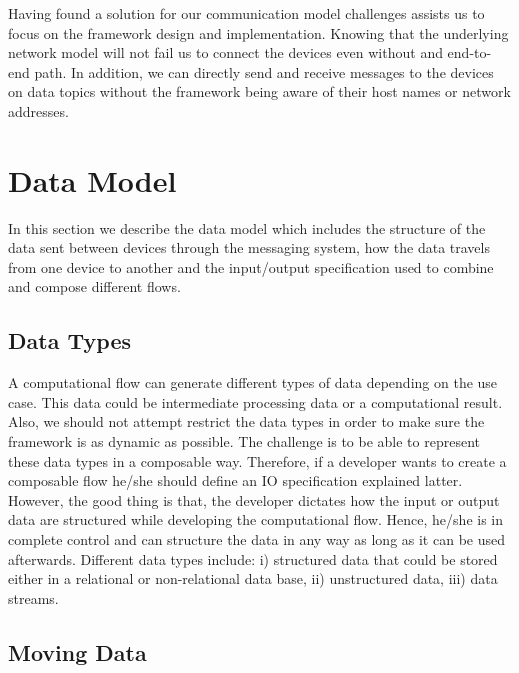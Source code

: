 \noindent Having found a solution for our communication model challenges assists us to focus on the framework design and implementation. Knowing that the underlying network model will not fail us to connect the devices even without and end-to-end path. In addition, we can directly send and receive messages to the devices on data topics without the framework being aware of their host names or network addresses.  




\section{Data Model}
In this section we describe the data model which includes the structure of the data sent between devices through the messaging system, how the data travels from one device to another and the input/output specification used to combine and compose different flows.

\subsection{Data Types}
A computational flow can generate different types of data depending on the use case. This data could be intermediate processing data or a computational result. Also, we should not attempt restrict the data types in order to make sure the framework is as dynamic as possible. The challenge is to be able to represent these data types in a composable way. Therefore, if a developer wants to create a composable flow he/she should define an IO specification explained latter. However, the good thing is that, the developer dictates how the input or output data are structured while developing the computational flow. Hence, he/she is in complete control and can structure the data in any way as long as it can be used afterwards.  Different data types include: i) structured data that could be stored either in a relational or non-relational data base, ii) unstructured data, iii)  data streams.

\subsection{Moving Data}

